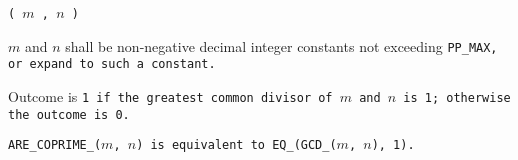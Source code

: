 
 \tt{(} $m$ \tt{,} $n$ \tt{)}


$m$ and $n$ shall be non-negative decimal integer constants
not exceeding \tt{PP_MAX}, or expand to such a constant.


Outcome is \tt{1} if the greatest common divisor of $m$ and $n$ is 1;
otherwise the outcome is \tt{0}.

\note \tt{ARE_COPRIME_(}$m$\tt{,} $n$\tt{)} is
equivalent to \tt{EQ_(GCD_(}$m$\tt{,} $n$\tt{), 1)}.
